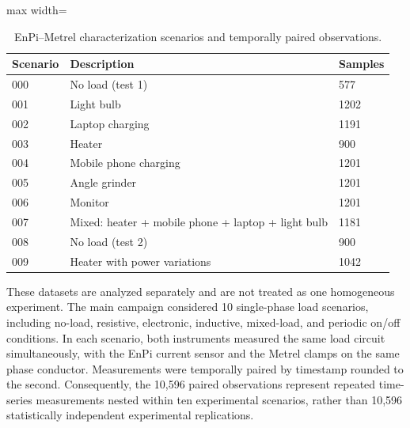 \documentclass[technologies,article,submit,pdftex,moreauthors]{Definitions/mdpi}
\begin{document}
\begin{table}[!h]
\caption{EnPi--Metrel characterization scenarios and temporally paired observations.}
\label{tab:escenarios-reales-de-validacion-de-enpi-metre}
\centering
\begin{adjustbox}{max width=\columnwidth}
\begin{tabular}{p{}p{}p{}}
\toprule
Scenario & Description & Samples \\
\midrule
000 & No load (test 1) & 577 \\
001 & Light bulb & 1202 \\
002 & Laptop charging & 1191 \\
003 & Heater & 900 \\
004 & Mobile phone charging & 1201 \\
005 & Angle grinder & 1201 \\
006 & Monitor & 1201 \\
007 & Mixed: heater + mobile phone + laptop + light bulb & 1181 \\
008 & No load (test 2) & 900 \\
009 & Heater with power variations & 1042 \\
\bottomrule
\end{tabular}
\end{adjustbox}
\end{table}

These datasets are analyzed separately and are not treated as one homogeneous experiment.
The main campaign considered 10 single-phase load scenarios, including no-load, resistive, electronic, inductive, mixed-load, and periodic on/off conditions. In each scenario, both instruments measured the same load circuit simultaneously, with the EnPi current sensor and the Metrel clamps on the same phase conductor. Measurements were temporally paired by timestamp rounded to the second. Consequently, the 10,596 paired observations represent repeated time-series measurements nested within ten experimental scenarios, rather than 10,596 statistically independent experimental replications.
\end{document}
